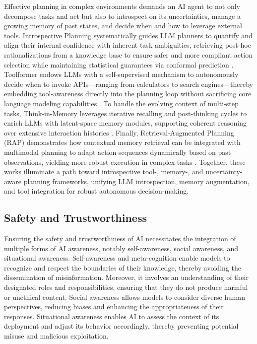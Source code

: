 Effective planning in complex environments demands an AI agent to not only decompose tasks and act but also to introspect on its uncertainties, manage a growing memory of past states, and decide when and how to leverage external tools. Introspective Planning systematically guides LLM planners to quantify and align their internal confidence with inherent task ambiguities, retrieving post-hoc rationalizations from a knowledge base to ensure safer and more compliant action selection while maintaining statistical guarantees via conformal prediction \citep{liang2024introspective}.
Toolformer endows LLMs with a self-supervised mechanism to autonomously decide when to invoke APIs—ranging from calculators to search engines—thereby embedding tool-awareness directly into the planning loop without sacrificing core language modeling capabilities \citep{schick2023toolformer}.
To handle the evolving context of multi-step tasks, Think-in-Memory leverages iterative recalling and post-thinking cycles to enrich LLMs with latent-space memory modules, supporting coherent reasoning over extensive interaction histories \citep{liu2023think}.
Finally, Retrieval‑Augmented Planning (RAP) demonstrates how contextual memory retrieval can be integrated with multimodal planning to adapt action sequences dynamically based on past observations, yielding more robust execution in complex tasks \citep{kagaya2024rap}.
Together, these works illuminate a path toward introspective tool-, memory-, and uncertainty-aware planning frameworks, unifying LLM introspection, memory augmentation, and tool integration for robust autonomous decision-making.





\subsection{Safety and Trustworthiness}

Ensuring the safety and trustworthiness of AI necessitates the integration of multiple forms of AI awareness, notably self-awareness, social awareness, and situational awareness. Self-awareness and meta-cognition enable models to recognize and respect the boundaries of their knowledge, thereby avoiding the dissemination of misinformation. Moreover, it involves an understanding of their designated roles and responsibilities, ensuring that they do not produce harmful or unethical content. Social awareness allows models to consider diverse human perspectives, reducing biases and enhancing the appropriateness of their responses. Situational awareness enables AI to assess the context of its deployment and adjust its behavior accordingly, thereby preventing potential misuse and malicious exploitation.


